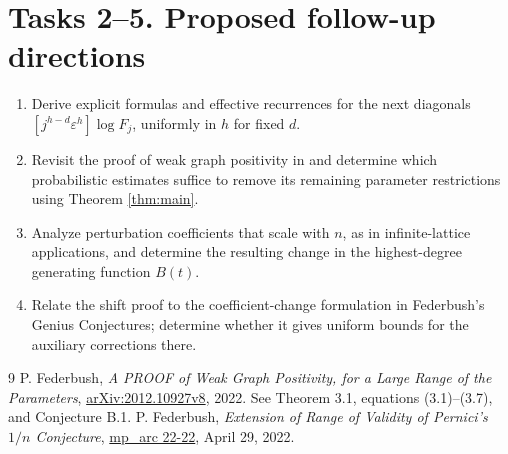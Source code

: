 \documentclass[11pt]{article}
\newcommand{\eps}{\varepsilon}
\begin{document}
\section*{Tasks 2--5. Proposed follow-up directions}
\begin{enumerate}[label=\textbf{Task \arabic*.},start=2,leftmargin=*]
\item Derive explicit formulas and effective recurrences for the next
diagonals $[j^{h-d}\eps^h]\log F_j$, uniformly in $h$ for fixed $d$.
\item Revisit the proof of weak graph positivity in \cite{fed} and
determine which probabilistic estimates suffice to remove its
remaining parameter restrictions using Theorem \ref{thm:main}.
\item Analyze perturbation coefficients that scale with $n$, as in
infinite-lattice applications, and determine the resulting change in
the highest-degree generating function $B(t)$.
\item Relate the shift proof to the coefficient-change formulation in
Federbush's Genius Conjectures; determine whether it gives uniform
bounds for the auxiliary corrections there.
\end{enumerate}

\begin{thebibliography}{9}
 P. Federbush,
\emph{A PROOF of Weak Graph Positivity, for a Large Range of the Parameters},
\href{https://arxiv.org/abs/2012.10927v8}{arXiv:2012.10927v8}, 2022.
See Theorem 3.1, equations (3.1)--(3.7), and Conjecture B.1.
 P. Federbush,
\emph{Extension of Range of Validity of Pernici's $1/n$ Conjecture},
\href{https://web.ma.utexas.edu/mp_arc-bin/mpa?yn=22-22}{mp\_arc 22-22},
April 29, 2022.
\end{thebibliography}
\end{document}
